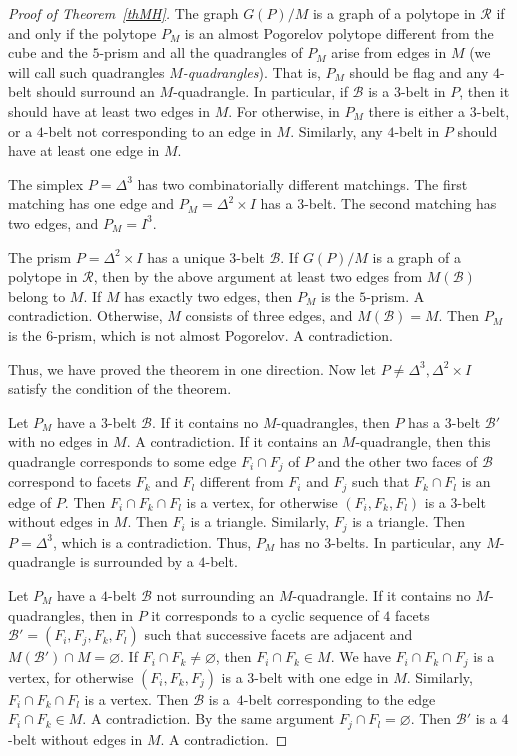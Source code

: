 \documentclass[12pt]{amsart}
\theoremstyle{definition}
\theoremstyle{remark}
\begin{document}
\begin{proof}[Proof of Theorem~\ref{thMH}]
The graph $G(P)/M$ is a graph of a polytope in $\mathcal{R}$ if and only if the polytope $P_M$
is an almost Pogorelov polytope different from the cube and the $5$-prism and all the quadrangles of 
$P_M$ arise from edges in $M$ (we will call such quadrangles {\it $M$-quadrangles}). 
That is, $P_M$ should be flag and any $4$-belt should 
surround an $M$-quadrangle. In particular, if $\mathcal{B}$ is a $3$-belt in $P$,
then it should have at least two edges in $M$. For otherwise, in $P_M$ there is either a $3$-belt, or a $4$-belt not 
corresponding to an edge in $M$. Similarly,  any  $4$-belt in $P$ should have at least one edge in $M$.

The simplex $P=\Delta^3$ has two combinatorially different 
matchings. The first matching has one edge and $P_M=\Delta^2\times I$ has a $3$-belt. The second matching has two edges, and 
$P_M=I^3$. 

The prism $P=\Delta^2\times I$ has a unique $3$-belt $\mathcal{B}$. If $G(P)/M$ is a graph of a polytope in 
$\mathcal{R}$, then by the above argument at least two
edges from $M(\mathcal{B})$ belong to $M$. If $M$ has exactly two edges, then $P_M$ is the $5$-prism. A contradiction.
Otherwise, $M$ consists of three edges, and $M(\mathcal{B})=M$. Then $P_M$ is the $6$-prism, 
which is not almost Pogorelov. A contradiction.

Thus, we have proved the theorem in one direction. Now let $P\ne \Delta^3, \Delta^2\times I$ satisfy the condition of the theorem.

Let $P_M$ have a $3$-belt $\mathcal{B}$. 
If it contains no $M$-quadrangles, then $P$ has a $3$-belt  $\mathcal{B}'$ with no edges in $M$.
A contradiction. If it contains an $M$-quadrangle, then this quadrangle corresponds to some edge 
$F_i\cap F_j$ of $P$ and the other two faces of $\mathcal{B}$ correspond to facets $F_k$ and $F_l$ different from $F_i$ and $F_j$ such that $F_k\cap F_l$ is an edge of $P$. Then $F_i\cap F_k\cap F_l$ is a vertex, for otherwise $(F_i,F_k,F_l)$ 
is a $3$-belt without edges in $M$. Then $F_i$ is
a triangle. Similarly, $F_j$ is a triangle. Then $P=\Delta^3$, which is a contradiction. Thus, $P_M$ has no $3$-belts. 
In particular, any $M$-quadrangle is surrounded by a $4$-belt.

Let $P_M$ have a $4$-belt  $\mathcal{B}$ not surrounding an $M$-quadrangle.
If it contains no $M$-quadrangles, then in $P$ it corresponds to a cyclic sequence of $4$ facets 
$\mathcal{B}'=(F_i,F_j,F_k,F_l)$ such that successive facets are adjacent and  $M(\mathcal{B}')\cap M=\varnothing$.
If $F_i\cap F_k\ne\varnothing$, then $F_i\cap F_k\in M$. We have $F_i\cap F_k\cap F_j$ is a vertex, for otherwise 
$(F_i,F_k,F_j)$ is a $3$-belt with one edge in $M$. Similarly,  $F_i\cap F_k\cap F_l$ is a vertex. Then $\mathcal{B}$ is 
a~$4$-belt corresponding to the edge $F_i\cap F_k\in M$.
A contradiction. By the same argument  $F_j\cap F_l=\varnothing$. Then $\mathcal{B}'$ is a $4$-belt without edges in $M$. A contradiction.


\end{proof}
\end{document}

